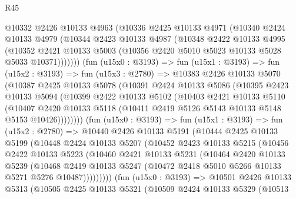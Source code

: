 \begin{lexlean}{R45}
\begin{coremodule}
        @10332
          @2426
          @10133
          @4963
          (@10336
            @2425
            @10133
            @4971
            (@10340
              @2424
              @10133
              @4979
              (@10344
                @2423
                @10133
                @4987
                (@10348
                  @2422
                  @10133
                  @4995
                  (@10352
                    @2421
                    @10133
                    @5003
                    (@10356 @2420 @5010 @5023 @10133 @5028 @5033 @10371)))))))
        (fun (u15x0 : @3193) =>
        fun (u15x1 : @3193) =>
        fun (u15x2 : @3193) =>
        fun (u15x3 : @2780) =>
        @10383
          @2426
          @10133
          @5070
          (@10387
            @2425
            @10133
            @5078
            (@10391
              @2424
              @10133
              @5086
              (@10395
                @2423
                @10133
                @5094
                (@10399
                  @2422
                  @10133
                  @5102
                  (@10403
                    @2421
                    @10133
                    @5110
                    (@10407
                      @2420
                      @10133
                      @5118
                      (@10411 @2419 @5126 @5143 @10133 @5148 @5153 @10426))))))))
        (fun (u15x0 : @3193) =>
        fun (u15x1 : @3193) =>
        fun (u15x2 : @2780) =>
        @10440
          @2426
          @10133
          @5191
          (@10444
            @2425
            @10133
            @5199
            (@10448
              @2424
              @10133
              @5207
              (@10452
                @2423
                @10133
                @5215
                (@10456
                  @2422
                  @10133
                  @5223
                  (@10460
                    @2421
                    @10133
                    @5231
                    (@10464
                      @2420
                      @10133
                      @5239
                      (@10468
                        @2419
                        @10133
                        @5247
                        (@10472 @2418 @5010 @5266 @10133 @5271 @5276 @10487)))))))))
        (fun (u15x0 : @3193) =>
        @10501
          @2426
          @10133
          @5313
          (@10505
            @2425
            @10133
            @5321
            (@10509
              @2424
              @10133
              @5329
              (@10513

\end{coremodule}
\end{lexlean}
